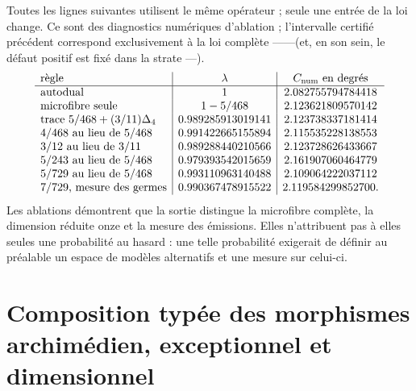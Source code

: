 Toutes les lignes suivantes utilisent le même opérateur ; seule une entrée
de la loi change. Ce sont des diagnostics numériques d’ablation ; l’intervalle certifié
précédent correspond exclusivement à la loi complète
\HTr--\HAdd--\HDef--\HRes--\HLoc (et, en son sein, le défaut positif est fixé dans la
strate \HTr--\HAdd--\HDef).
\[
\begin{array}{l|c|c}
\text{règle}&\lambda&C_{\rm num}\text{ en degrés}\\ \hline
\text{autodual}&1&2.082755794784418\\
\text{microfibre seule}&1-5/468&2.123621809570142\\
\text{trace }5/468+(3/11)\Delta_4
&0.989285913019141&2.123738337181414\\
4/468\text{ au lieu de }5/468
&0.991422665155894&2.115535228138553\\
3/12\text{ au lieu de }3/11
&0.989288440210566&2.123728626433667\\
5/243\text{ au lieu de }5/468
&0.979393542015659&2.161907060464779\\
5/729\text{ au lieu de }5/468
&0.993110963140488&2.109064222037112\\
7/729\text{, mesure des germes}
&0.990367478915522&2.119584299852700.
\end{array}
\]
Les ablations démontrent que la sortie distingue la microfibre complète,
la dimension réduite onze et la mesure des émissions. Elles n’attribuent pas à elles
seules une probabilité au hasard : une telle probabilité exigerait de définir au préalable un
espace de modèles alternatifs et une mesure sur celui-ci.

\section{Composition typée des morphismes archimédien, exceptionnel et dimensionnel}

